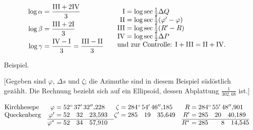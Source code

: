 \par\clearpage
\noindent{}\makebox[12mm][r]{}\par\medskip

\[
\begin{array}{@{}l@{\qquad}l@{}}
\begin{aligned}[t]
\log\alpha&=\frac{\mathrm{III}+2\mathrm{IV}}3\\[.4ex]
\log\beta&=\frac{\mathrm{III}+2\mathrm I}3\\[.4ex]
\log\gamma&=\frac{\mathrm{IV}-\mathrm I}3=\frac{\mathrm{III}-\mathrm{II}}3
\end{aligned}
&
\begin{array}[t]{@{}r@{\;}l@{}}
\mathrm{I}&=\log\sec\tfrac12\Delta Q\\
\mathrm{II}&=\log\sec\tfrac12(\varphi'-\varphi)\\
\mathrm{III}&=\log\sec\tfrac12(R'-R)\\
\mathrm{IV}&=\log\sec\tfrac12\Delta P\\
\multicolumn{2}{@{}l@{}}{\text{und zur Controlle: }\mathrm I+\mathrm{III}=\mathrm{II}+\mathrm{IV}.}
\end{array}
\end{array}
\]

\begin{center}Beispiel.\end{center}
[Gegeben sind \(\varphi\), \(\Delta s\) und \(\zeta\); die Azimuthe sind in diesem Beispiel
südöstlich gezählt. Die Rechnung bezieht sich auf ein Ellipsoid, dessen
Abplattung \(\frac1{302{,}68}\) ist.]

\[
\begin{array}{@{}l@{\quad}r@{\;}l@{\quad}r@{\;}l@{\quad}r@{\;}l@{}}
\text{Kirchhesepe}&\varphi=&52^\circ\,37'\,32''{,}228&
\zeta=&284^\circ\,54'\,46''{,}185&R=&284^\circ\,55'\,48''{,}901\\
\text{Queckenberg}&\varphi'=&52\quad32\quad23{,}593&
\zeta'=&285\quad19\quad35{,}649&R'=&285\quad20\quad40{,}189\\
\cline{2-3}\cline{6-7}
&\varphi^*=&52\quad34\quad57{,}910&&&R^*=&285\qquad8\quad14{,}545
\end{array}
\]

